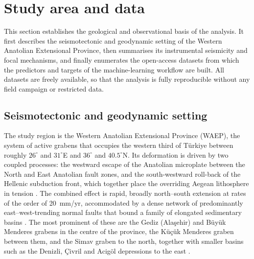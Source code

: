 \documentclass[pdflatex,sn-mathphys-num]{sn-jnl}%
\theoremstyle{thmstyleone}%
\theoremstyle{thmstyletwo}%
\theoremstyle{thmstylethree}%
\begin{document}
\section{Study area and data}\label{sec:study}
This section establishes the geological and observational basis of the analysis. It
first describes the seismotectonic and geodynamic setting of the Western Anatolian
Extensional Province, then summarises its instrumental seismicity and focal
mechanisms, and finally enumerates the open-access datasets from which the
predictors and targets of the machine-learning workflow are built. All datasets are
freely available, so that the analysis is fully reproducible without any field
campaign or restricted data.

\subsection{Seismotectonic and geodynamic setting}\label{sec:setting}
The study region is the Western Anatolian Extensional Province (WAEP), the system of
active grabens that occupies the western third of T\"{u}rkiye between roughly
$26^{\circ}$ and $31^{\circ}$E and $36^{\circ}$ and $40.5^{\circ}$N. Its deformation
is driven by two coupled processes: the westward escape of the Anatolian microplate
between the North and East Anatolian fault zones, and the south-westward roll-back of
the Hellenic subduction front, which together place the overriding Aegean lithosphere
in tension \cite{McKenzie1972,Jackson1994,LePichonAngelier1979,Jolivet2013,Taymaz2007}. The combined
effect is rapid, broadly north--south extension at rates of the order of 20~mm/yr,
accommodated by a dense network of predominantly east--west-trending normal faults
that bound a family of elongated sedimentary basins
\cite{Aktug2009,SengorYilmaz1981,Bozkurt2001,TenVeen2009}. The most prominent of these are the Gediz
(Ala\c{s}ehir) and B\"{u}y\"{u}k Menderes grabens in the centre of the province, the
K\"{u}\c{c}\"{u}k Menderes graben between them, and the Simav graben to the north,
together with smaller basins such as the Denizli, \c{C}ivril and Acig\"{o}l
depressions to the east \cite{BozkurtSozbilir2004,Kocyigit2005,Emre2018,McKenzie1978,Diercks2024}.
\end{document}
